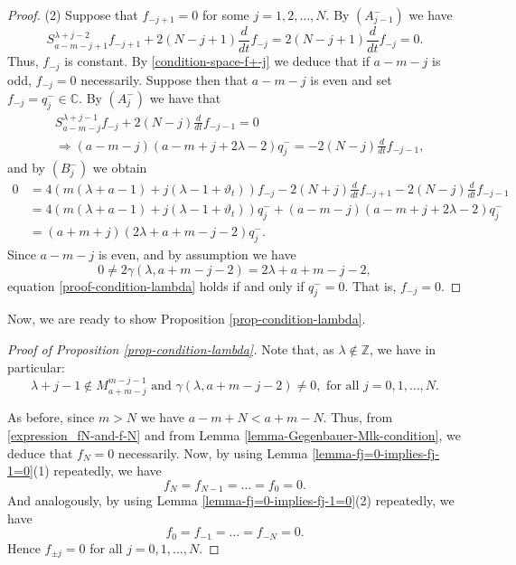 \documentclass[12pt, pdflatex, a4paper]{article}
\theoremstyle{plain}
\theoremstyle{definition}
\def\C{{\mathbb C}}
\def\Z{{\mathbb Z}}
\begin{document}
\begin{proof}
(2) Suppose that $f_{-j+1} = 0$ for some $j = 1, 2, \dots, N$. By $(A_{j-1}^-)$ we have
\begin{equation*}
S_{a-m-j+1}^{\lambda+j-2} f_{-j+1} + 2(N-j+1) \frac{d}{dt}f_{-j} =  2(N-j+1) \frac{d}{dt}f_{-j} = 0.
\end{equation*}
Thus, $f_{-j}$ is constant. By \eqref{condition-space-f+-j} we deduce that if $a-m-j$ is odd, $f_{-j} = 0$ necessarily. Suppose then that $a-m-j$ is even and set $f_{-j} = q_{j}^- \in \C$. By $(A_j^-)$ we have that
\begin{equation*}
\begin{aligned}
&S_{a-m-j}^{\lambda+j-1}f_{-j} + 2(N-j)\frac{d}{dt}f_{-j-1} = 0\\
&\Rightarrow (a-m-j)(a-m+j+2\lambda-2)q_j^- = -2(N-j)\frac{d}{dt}f_{-j-1},
\end{aligned}
\end{equation*}
and by $(B_j^-)$ we obtain
\begin{equation}\label{proof-condition-lambda}
\begin{aligned}
0 &=  4(m(\lambda + a-1) + j(\lambda-1 + \vartheta_t))f_{-j}
- 2(N+j)\frac{d}{dt}f_{-j+1} - 2(N-j) \frac{d}{dt}f_{-j-1} \\
&= 4(m(\lambda + a-1) + j(\lambda-1 + \vartheta_t))q_{j}^- + (a-m-j)(a-m+j+2\lambda-2)q_j^-\\
& = (a+m+j)(2\lambda+a+m-j-2)q_j^-.
\end{aligned}
\end{equation}
Since $a-m-j$ is even, and by assumption we have
\begin{equation*}
0 \neq 2\gamma(\lambda, a+m-j-2) = 2\lambda+a+m-j-2,
\end{equation*}
equation \eqref{proof-condition-lambda} holds if and only if $q_j^- = 0$. That is, $f_{-j} = 0$.
\end{proof}

Now, we are ready to show Proposition \ref{prop-condition-lambda}.

\begin{proof}[Proof of Proposition \ref{prop-condition-lambda}]
Note that, as $\lambda \notin \Z$, we have in particular:
\begin{equation*}
\lambda+j-1 \notin M_{a+m-j}^{m-j-1} \text{ and }\gamma(\lambda, a+m-j-2) \neq 0, \text{ for all }j = 0, 1, \ldots, N.
\end{equation*}

As before, since $m>N$ we have $a-m+N < a+m-N$. Thus, from \eqref{expression_fN-and-f-N} and from Lemma \ref{lemma-Gegenbauer-Mlk-condition}, we deduce that $f_N = 0$ necessarily. Now, by using Lemma \ref{lemma-fj=0-implies-fj-1=0}(1) repeatedly, we have 
\begin{equation*}
f_N = f_{N-1} = \dots = f_0 = 0.
\end{equation*}
And analogously, by using Lemma \ref{lemma-fj=0-implies-fj-1=0}(2) repeatedly, we have 
\begin{equation*}
f_0 = f_{-1} = \dots = f_{-N} = 0.
\end{equation*}
Hence $f_{\pm j} = 0$ for all $j = 0, 1, \ldots, N$.
\end{proof}
\end{document}
